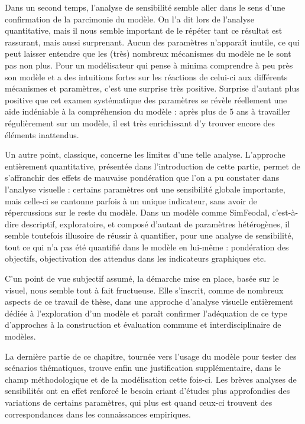 Dans un second temps, l'analyse de sensibilité semble aller dans le sens d'une confirmation de la parcimonie du modèle.
On l'a dit lors de l'analyse quantitative, mais il nous semble important de le répéter tant ce résultat est rassurant, mais aussi surprenant.
Aucun des paramètres n'apparaît inutile, ce qui peut laisser entendre que les (très) nombreux mécanismes du modèle ne le sont pas non plus.
Pour un modélisateur qui pense à minima comprendre à peu près son modèle et a des intuitions fortes sur les réactions de celui-ci aux différents mécanismes et paramètres, c'est une surprise très positive.
Surprise d'autant plus positive que cet examen systématique des paramètres se révèle réellement une aide indéniable à la compréhension du modèle : après plus de 5 ans à travailler régulièrement sur un modèle, il est très enrichissant d'y trouver encore des éléments inattendus.

Un autre point, classique, concerne les limites d'une telle analyse.
L'approche entièrement quantitative, présentée dans l'introduction de cette partie, permet de s'affranchir des effets de mauvaise pondération que l'on a pu constater dans l'analyse visuelle : certains paramètres ont une sensibilité globale importante, mais celle-ci se cantonne parfois à un unique indicateur, sans avoir de répercussions sur le reste du modèle.
Dans un modèle comme SimFeodal, c'est-à-dire descriptif, exploratoire, et composé d'autant de paramètres hétérogènes, il semble toutefois illusoire de réussir à quantifier, pour une analyse de sensibilité, tout ce qui n'a pas été quantifié dans le modèle en lui-même : pondération des objectifs, objectivation des attendus dans les indicateurs graphiques etc.

C'un point de vue subjectif assumé, la démarche mise en place, basée sur le visuel, nous semble tout à fait fructueuse. 
Elle s'inscrit, comme de nombreux aspects de ce travail de thèse, dans une approche d'analyse visuelle entièrement dédiée à l'exploration d'un modèle et paraît confirmer l'adéquation de ce type d'approches à la construction et évaluation commune et interdisciplinaire de modèles.

La dernière partie de ce chapitre, tournée vers l'usage du modèle pour tester des scénarios thématiques, trouve enfin une justification supplémentaire, dans le champ méthodologique et de la modélisation cette fois-ci.
Les brèves analyses de sensibilités ont en effet renforcé le besoin criant d'études plus approfondies des variations de certains paramètres, qui plus est quand ceux-ci trouvent des correspondances dans les connaissances empiriques.
